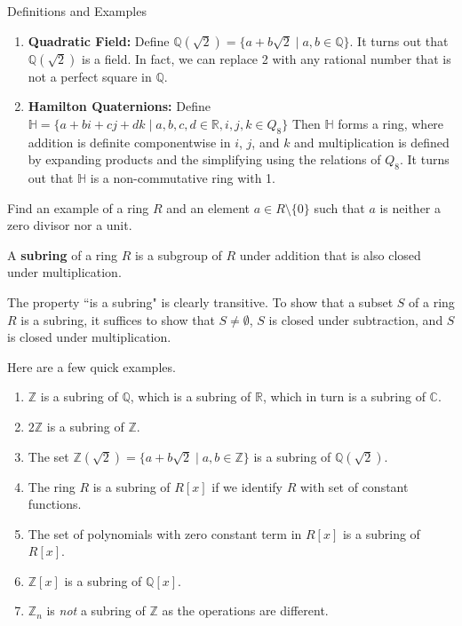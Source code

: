 \begin{section}{Definitions and Examples}
\begin{example}
\begin{enumerate}[label=\rm{(\alph*)}]
\item \textbf{Quadratic Field:} Define $\mathbb{Q}(\sqrt{2})=\{a+b\sqrt{2}\mid a,b\in\mathbb{Q}\}$.  It turns out that $\mathbb{Q}(\sqrt{2})$ is a field.  In fact, we can replace 2 with any rational number that is not a perfect square in $\mathbb{Q}$.
\item \textbf{Hamilton Quaternions:} Define $\mathbb{H}=\{a+bi+cj+dk\mid a,b,c,d\in\mathbb{R}, i,j,k\in Q_8\}$  Then $\mathbb{H}$ forms a ring, where addition is definite componentwise in $i$, $j$, and $k$ and multiplication is defined by expanding products and the simplifying using the relations of $Q_8$.  It turns out that $\mathbb{H}$ is a non-commutative ring with 1.
\end{enumerate}
\end{example}

\begin{problem}
Find an example of a ring $R$ and an element $a\in R\setminus\{0\}$ such that $a$ is neither a zero divisor nor a unit.
\end{problem}

\begin{definition}
A \textbf{subring} of a ring $R$ is a subgroup of $R$ under addition that is also closed under multiplication.
\end{definition}

\begin{remark}
The property ``is a subring" is clearly transitive. To show that a subset $S$ of a ring $R$ is a subring, it suffices to show that $S\neq \emptyset$, $S$ is closed under subtraction, and $S$ is closed under multiplication.
\end{remark}

\begin{example}
Here are a few quick examples.
\begin{enumerate}[label=\rm{(\alph*)}]
\item $\mathbb{Z}$ is a subring of $\mathbb{Q}$, which is a subring of $\mathbb{R}$, which in turn is a subring of $\mathbb{C}$.
\item $2\mathbb{Z}$ is a subring of $\mathbb{Z}$.
\item The set $\mathbb{Z}(\sqrt{2})=\{a+b\sqrt{2}\mid a,b\in\mathbb{Z}\}$ is a subring of $\mathbb{Q}(\sqrt{2})$.
\item The ring $R$ is a subring of $R[x]$ if we identify $R$ with set of constant functions.
\item The set of polynomials with zero constant term in $R[x]$ is a subring of $R[x]$.
\item $\mathbb{Z}[x]$ is a subring of $\mathbb{Q}[x]$.
\item $\mathbb{Z}_n$ is \emph{not} a subring of $\mathbb{Z}$ as the operations are different.
\end{enumerate} 
\end{example}


\end{section}

